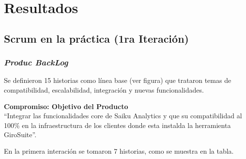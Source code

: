\chapter{Resultados} \label{chapter:III}
\section{Scrum en la pr\'{a}ctica (1ra Iteraci\'{o}n)}
\begin{spacing}{1.5}
	\subsection{\textit{Produc BackLog}}
	Se definieron 15 historias como l\'{i}nea base (ver figura) que trataron temas de compatibilidad, escalabilidad, integraci\'{o}n y nuevas funcionalidades.
	
	\textbf{Compromiso: Objetivo del Producto}\\
	``Integrar las funcionalidades core de Saiku Analytics y que su compatibilidad al 100\% en la infraestructura de los clientes donde esta instalda la herramienta GiroSuite''.
	
	En la primera interaci\'{o}n se tomaron 7 historias, como se muestra en la tabla. 
	


\end{spacing}
